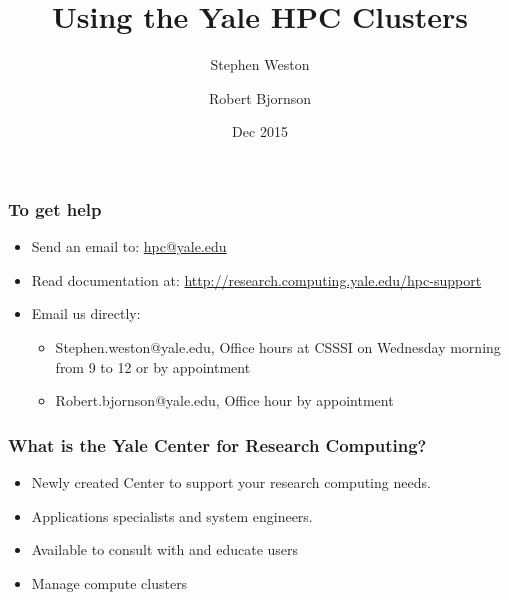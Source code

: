 \documentclass[10pt]{beamer}
\title{Using the Yale HPC Clusters}
\author{{Stephen Weston} \and {Robert Bjornson}}
\institute[Yale]{
  Yale Center for Research Computing \\
  Yale University
}
\date{Dec 2015}
\begin{document}
\begin{frame}[plain]
  \titlepage
\end{frame}

\begin{frame}
\frametitle{To get help}
\begin{itemize}
\item Send an email to: \url{hpc@yale.edu}
\item Read documentation at: \url{http://research.computing.yale.edu/hpc-support}
\item Email us directly:
\begin{itemize}
\item Stephen.weston@yale.edu, Office hours at CSSSI on Wednesday morning from 9 to 12 or by appointment
\item Robert.bjornson@yale.edu, Office hour by appointment
\end{itemize}
\end{itemize}
\end{frame}

\begin{frame}
\frametitle{What is the Yale Center for Research Computing?}

\begin{itemize}
\item Newly created Center to support your research computing needs.
\item Applications specialists and system engineers.
\item Available to consult with and educate users
\item Manage compute clusters
\end{itemize}
\end{frame}
\end{document}
